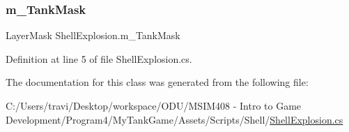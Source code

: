 \mbox{\label{class_shell_explosion_a7836a8802592e5b16960749293b7e8a1}} 
\subsubsection{\texorpdfstring{m\+\_\+\+Tank\+Mask}{m\_TankMask}}
{\footnotesize\ttfamily Layer\+Mask Shell\+Explosion.\+m\+\_\+\+Tank\+Mask}



Definition at line 5 of file Shell\+Explosion.\+cs.



The documentation for this class was generated from the following file\+:\begin{DoxyCompactItemize}
\item 
C\+:/\+Users/travi/\+Desktop/workspace/\+O\+D\+U/\+M\+S\+I\+M408 -\/ Intro to Game Development/\+Program4/\+My\+Tank\+Game/\+Assets/\+Scripts/\+Shell/\hyperlink{_shell_explosion_8cs}{Shell\+Explosion.\+cs}\end{DoxyCompactItemize}
